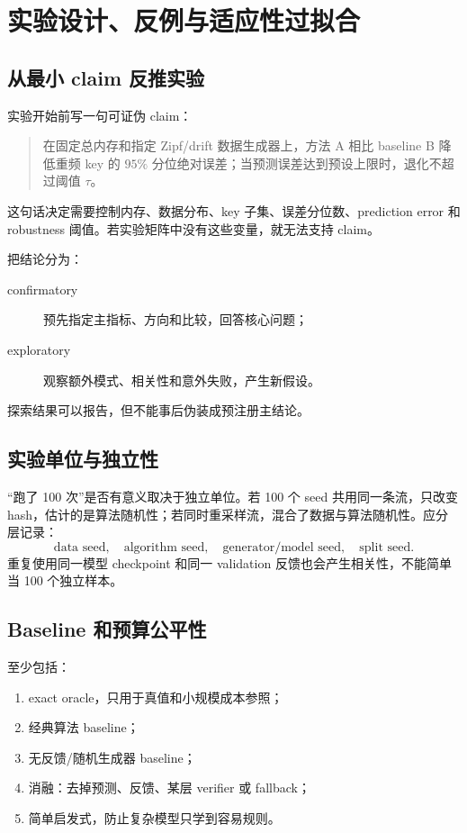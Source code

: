 \chapter{实验设计、反例与适应性过拟合}

\section{从最小 claim 反推实验}

实验开始前写一句可证伪 claim：
\begin{quote}
在固定总内存和指定 Zipf/drift 数据生成器上，方法 A 相比 baseline B 降低重频 key 的 $95\%$ 分位绝对误差；当预测误差达到预设上限时，退化不超过阈值 $\tau$。
\end{quote}
这句话决定需要控制内存、数据分布、key 子集、误差分位数、prediction error 和 robustness 阈值。若实验矩阵中没有这些变量，就无法支持 claim。

把结论分为：
\begin{description}
  \item[confirmatory] 预先指定主指标、方向和比较，回答核心问题；
  \item[exploratory] 观察额外模式、相关性和意外失败，产生新假设。
\end{description}
探索结果可以报告，但不能事后伪装成预注册主结论。

\section{实验单位与独立性}

“跑了 100 次”是否有意义取决于独立单位。若 100 个 seed 共用同一条流，只改变 hash，估计的是算法随机性；若同时重采样流，混合了数据与算法随机性。应分层记录：
\[
\text{data seed},\quad
\text{algorithm seed},\quad
\text{generator/model seed},\quad
\text{split seed}.
\]
重复使用同一模型 checkpoint 和同一 validation 反馈也会产生相关性，不能简单当 100 个独立样本。

\section{Baseline 和预算公平性}

至少包括：
\begin{enumerate}
  \item exact oracle，只用于真值和小规模成本参照；
  \item 经典算法 baseline；
  \item 无反馈/随机生成器 baseline；
  \item 消融：去掉预测、反馈、某层 verifier 或 fallback；
  \item 简单启发式，防止复杂模型只学到容易规则。
\end{enumerate}

